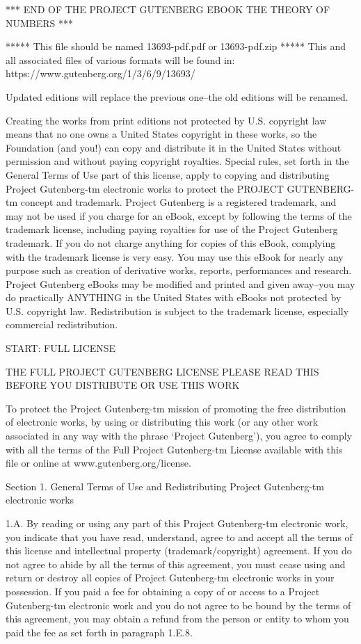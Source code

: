 \documentclass[oneside]{book}
\begin{document}
*** END OF THE PROJECT GUTENBERG EBOOK THE THEORY OF NUMBERS  ***

***** This file should be named 13693-pdf.pdf or 13693-pdf.zip *****
This and all associated files of various formats will be found in:
    https://www.gutenberg.org/1/3/6/9/13693/

Updated editions will replace the previous one--the old editions will
be renamed.

Creating the works from print editions not protected by U.S. copyright
law means that no one owns a United States copyright in these works,
so the Foundation (and you!) can copy and distribute it in the
United States without permission and without paying copyright
royalties. Special rules, set forth in the General Terms of Use part
of this license, apply to copying and distributing Project
Gutenberg-tm electronic works to protect the PROJECT GUTENBERG-tm
concept and trademark. Project Gutenberg is a registered trademark,
and may not be used if you charge for an eBook, except by following
the terms of the trademark license, including paying royalties for use
of the Project Gutenberg trademark. If you do not charge anything for
copies of this eBook, complying with the trademark license is very
easy. You may use this eBook for nearly any purpose such as creation
of derivative works, reports, performances and research. Project
Gutenberg eBooks may be modified and printed and given away--you may
do practically ANYTHING in the United States with eBooks not protected
by U.S. copyright law. Redistribution is subject to the trademark
license, especially commercial redistribution.

START: FULL LICENSE

THE FULL PROJECT GUTENBERG LICENSE
PLEASE READ THIS BEFORE YOU DISTRIBUTE OR USE THIS WORK

To protect the Project Gutenberg-tm mission of promoting the free
distribution of electronic works, by using or distributing this work
(or any other work associated in any way with the phrase `Project
Gutenberg'), you agree to comply with all the terms of the Full
Project Gutenberg-tm License available with this file or online at
www.gutenberg.org/license.

Section 1. General Terms of Use and Redistributing Project
Gutenberg-tm electronic works

1.A. By reading or using any part of this Project Gutenberg-tm
electronic work, you indicate that you have read, understand, agree to
and accept all the terms of this license and intellectual property
(trademark/copyright) agreement. If you do not agree to abide by all
the terms of this agreement, you must cease using and return or
destroy all copies of Project Gutenberg-tm electronic works in your
possession. If you paid a fee for obtaining a copy of or access to a
Project Gutenberg-tm electronic work and you do not agree to be bound
by the terms of this agreement, you may obtain a refund from the
person or entity to whom you paid the fee as set forth in paragraph
1.E.8.
\end{document}
